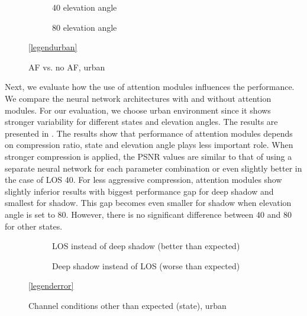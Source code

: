 \documentclass[conference]{IEEEtran}
\begin{document}
\begin{figure}[t!]
  \begin{subfigure}{.48\linewidth}
  \centering
  
  \caption{40 elevation angle}
\end{subfigure}
\hfill
\begin{subfigure}{.48\linewidth}
  \centering
  
  \caption{80 elevation angle}
\end{subfigure}

\vspace{1em}
\centering
\ref{legendurban}

\caption{AF vs. no AF, urban}
\label{fig:af_vs_no_af}
\end{figure}


Next, we evaluate how the use of attention modules influences the performance.
We compare the neural network architectures with and without attention modules.
For our evaluation, we choose urban environment since it shows stronger variability for different states and elevation angles.
The results are presented in .
The results show that performance of attention modules depends on compression ratio, state and elevation angle plays less important role. 
When stronger compression is applied, the PSNR values are similar to that of using a separate neural network for each parameter combination or even slightly better in the case of LOS 40.
For less aggressive compression, attention modules show slightly inferior results with biggest performance gap for deep shadow and smallest for shadow. 
This gap becomes even smaller for shadow when elevation angle is set to 80. 
However, there is no significant difference between 40 and 80 for other states.

\begin{figure}[t!]
  \begin{subfigure}{.48\linewidth}
  \centering
  
  \caption{LOS instead of deep shadow (better than expected)}
  \label{fig:different_state_same_snr_better}
\end{subfigure}
\hfill
\begin{subfigure}{.48\linewidth}
  \centering
  
  \caption{Deep shadow instead of LOS (worse than expected)}
  \label{fig:different_state_same_snr_worse}
\end{subfigure}

\vspace{1em}
\centering
\ref{legenderror}

\caption{Channel conditions other than expected (state), urban}
\label{fig:different_state_same_snr}
\end{figure}
\end{document}
